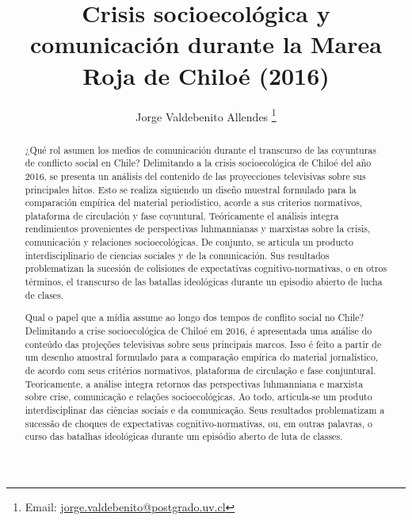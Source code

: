 \documentclass{textolivre}
\title{Crisis socioecológica y comunicación durante la Marea Roja de Chiloé (2016)}
\author[1]{Jorge Valdebenito Allendes \orcid{0000-0003-3249-1855} \thanks{Email: \url{jorge.valdebenito@postgrado.uv.cl}}}
\affil[1]{Universidad de Valparaíso, Valparaíso, Chile.}
\begin{document}
\maketitle

\begin{polyabstract}
\begin{abstract}
¿Qué rol asumen los medios de comunicación durante el transcurso de las
coyunturas de conflicto social en Chile? Delimitando a la crisis socioecológica de Chiloé
del año 2016, se presenta un análisis del contenido de las proyecciones televisivas sobre
sus principales hitos. Esto se realiza siguiendo un diseño muestral formulado para la
comparación empírica del material periodístico, acorde a sus criterios normativos,
plataforma de circulación y fase coyuntural. Teóricamente el análisis integra rendimientos
provenientes de perspectivas luhmannianas y marxistas sobre la crisis, comunicación y
relaciones socioecológicas. De conjunto, se articula un producto interdisciplinario de
ciencias sociales y de la comunicación. Sus resultados problematizan la sucesión de
colisiones de expectativas cognitivo-normativas, o en otros términos, el transcurso de las
batallas ideológicas durante un episodio abierto de lucha de clases.

\end{abstract}

\begin{portuguese}
\begin{abstract}
Qual o papel que a mídia assume ao longo dos tempos de conflito social no
Chile? Delimitando a crise socioecológica de Chiloé em 2016, é apresentada uma análise
do conteúdo das projeções televisivas sobre seus principais marcos. Isso é feito a partir
de um desenho amostral formulado para a comparação empírica do material jornalístico,
de acordo com seus critérios normativos, plataforma de circulação e fase conjuntural.
Teoricamente, a análise integra retornos das perspectivas luhmanniana e marxista sobre
crise, comunicação e relações socioecológicas. Ao todo, articula-se um produto
interdisciplinar das ciências sociais e da comunicação. Seus resultados problematizam a
sucessão de choques de expectativas cognitivo-normativas, ou, em outras palavras, o
curso das batalhas ideológicas durante um episódio aberto de luta de classes.

\end{abstract}
\end{portuguese}


\end{polyabstract}
\end{document}
